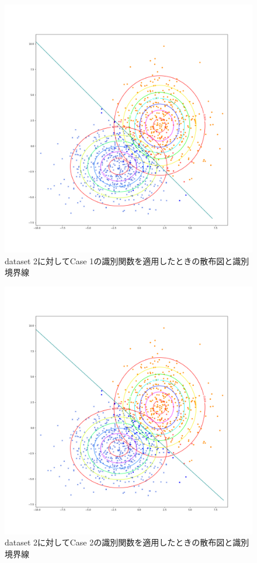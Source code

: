 \documentclass[class=jsarticle, crop=false, dvipdfmx, fleqn]{standalone}
\begin{document}
\begin{figure}
    \centering
    \includegraphics[clip, width=\linewidth]{../figures/result_assignment1_dataset2_case1.png}
    \caption{dataset 2に対してCase 1の識別関数を適用したときの散布図と識別境界線}
    \label{fig:result_dataset2_case1}
\end{figure}

\begin{figure}
    \centering
    \includegraphics[clip, width=\linewidth]{../figures/result_assignment1_dataset2_case2.png}
    \caption{dataset 2に対してCase 2の識別関数を適用したときの散布図と識別境界線}
    \label{fig:result_dataset2_case2}
\end{figure}
\end{document}

